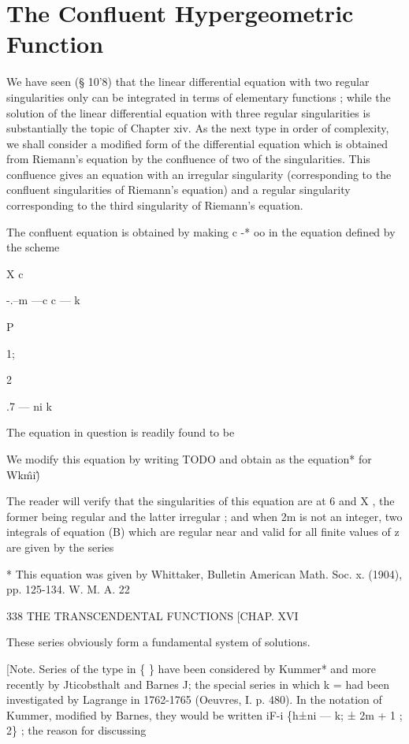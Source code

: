 \chapter{The Confluent Hypergeometric Function}


We have seen (§ 10'8) that the linear differential equation with two
regular singularities only can be integrated in terms of elementary
functions ; while the solution of the linear differential equation
with three regular singularities is substantially the topic of Chapter
xiv. As the next type in order of complexity, we shall consider a
modified form of the differential equation which is obtained from
Riemann's equation by the confluence of two of the singularities. This
confluence gives an equation with an irregular singularity
(corresponding to the confluent singularities of Riemann's equation)
and a regular singularity corresponding to the third singularity of
Riemann's equation.

The confluent equation is obtained by making c -* oo in the equation
defined by the scheme

X c

-.--m —c c — k

P

1;

2

.7 — ni k

The equation in question is readily found to be

We modify this equation by writing TODO and obtain as the equation*
for Wk\^mi\^)

The reader will verify that the singularities of this equation are at
6 and X , the former being regular and the latter irregular ; and when
2m is not an integer, two integrals of equation (B) which are regular
near and valid for all finite values of z are given by the series

* This equation was given by Whittaker, Bulletin American Math. Soc.
x. (1904), pp. 125-134. W. M. A. 22

338 THE TRANSCENDENTAL FUNCTIONS [CHAP. XVI

These series obviously form a fundamental system of solutions.

[Note. Series of the type in \{ \} have been considered by Kummer* and
more recently by Jticobsthalt and Barnes J; the special series in
which k = had been investigated by Lagrange in 1762-1765 (Oeuvres, I.
p. 480). In the notation of Kummer, modified by Barnes, they would be
written iF-i \{h±ni — k; ± 2m + 1 ; 2\} ; the reason for discussing

